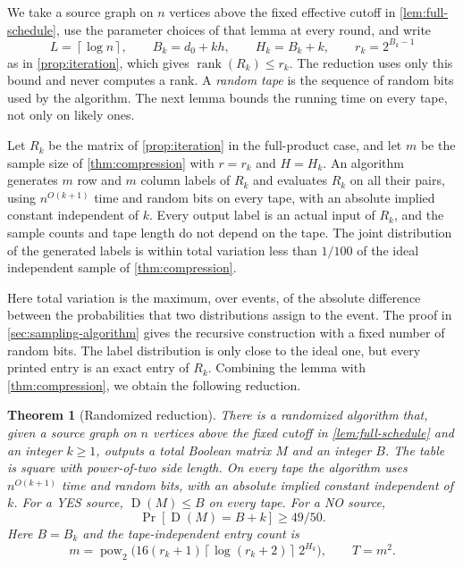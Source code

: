 \documentclass[11pt,letterpaper]{article} \usepackage[utf8]{inputenc}
\theoremstyle{plain} \newtheorem{theorem}{Theorem}[section]
\theoremstyle{definition} \newaliascnt{definition}{theorem}
\newcommand{\D}{\operatorname{D}}
\newcommand{\ceil}[1]{\left\lceil#1\right\rceil}
\DeclareMathOperator{\rank}{rank} \crefname{claim}{Claim}{Claims}
\begin{document}
We take a source graph on $n$ vertices above the fixed effective cutoff in
\cref{lem:full-schedule}, use the parameter choices of that lemma at every
round, and write
\[
L=\ceil{\log n},\qquad B_k=d_0+kh,\qquad H_k=B_k+k,\qquad r_k=2^{B_k-1}
\]
as in \cref{prop:iteration}, which gives $\rank(R_k)\le r_k$. The reduction
uses only this bound and never computes a rank. A \emph{random tape} is the sequence of random bits used
by the algorithm. The next lemma bounds the running time on every tape, not
only on likely ones.

\begin{lemma}\label{lem:sample-access}
Let $R_k$ be the matrix of \cref{prop:iteration} in the full-product case, and let $m$ be the sample size of
\cref{thm:compression} with $r=r_k$ and $H=H_k$. An algorithm generates $m$ row and $m$ column labels of $R_k$
and evaluates $R_k$ on all their pairs, using $n^{O(k+1)}$
time and random bits on every tape, with an absolute implied constant
independent of $k$. Every output label is an actual input of $R_k$, and the
sample counts and tape length do not depend on the tape. The joint distribution of the generated labels is within total
variation less than $1/100$ of the ideal independent sample of \cref{thm:compression}.
\end{lemma}

Here total variation is the maximum, over events, of the absolute difference between the probabilities
that two distributions assign to the event. The proof in
\cref{sec:sampling-algorithm} gives the recursive construction with a fixed
number of random bits. The label distribution is only close to the ideal one,
but every printed entry is an exact entry of $R_k$. Combining the lemma with
\cref{thm:compression}, we obtain the following reduction.

\begin{theorem}[Randomized reduction]\label{thm:uniform-reduction}
There is a randomized algorithm that, given a source graph on $n$ vertices above the fixed cutoff in \cref{lem:full-schedule} and
an integer $k\ge1$, outputs a total Boolean matrix $M$ and an integer $B$.
The table is square with power-of-two side length. On every tape the algorithm
uses $n^{O(k+1)}$ time and random bits, with an absolute implied
constant independent of $k$. For a YES source, $\D(M)\le B$ on every tape.
For a NO source,
\[
\Pr[\D(M)=B+k]\ge49/50.
\]
Here $B=B_k$ and the tape-independent entry count is
\[
m=\operatorname{pow}_2\bigl(16(r_k+1)\ceil{\log(r_k+2)}\,2^{H_k}\bigr),
\qquad T=m^2.
\]
\end{theorem}
\end{document}
